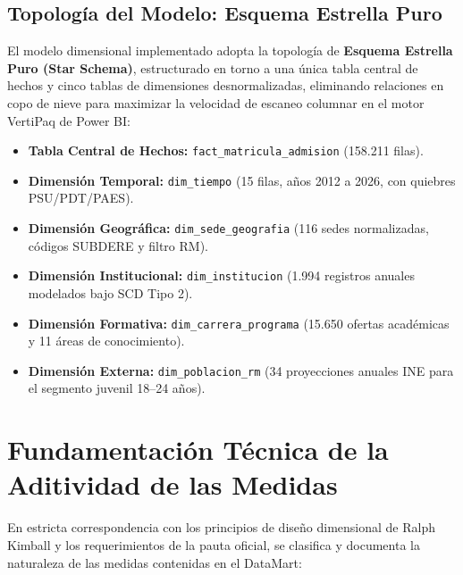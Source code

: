 \documentclass[11pt,a4paper]{article}
\begin{document}
\subsection{Topología del Modelo: Esquema Estrella Puro}
El modelo dimensional implementado adopta la topología de \textbf{Esquema Estrella Puro (Star Schema)}, estructurado en torno a una única tabla central de hechos y cinco tablas de dimensiones desnormalizadas, eliminando relaciones en copo de nieve para maximizar la velocidad de escaneo columnar en el motor VertiPaq de Power BI:
\begin{itemize}[leftmargin=*]
    \item \textbf{Tabla Central de Hechos:} \texttt{fact\_matricula\_admision} (158.211 filas).
    \item \textbf{Dimensión Temporal:} \texttt{dim\_tiempo} (15 filas, años 2012 a 2026, con quiebres PSU/PDT/PAES).
    \item \textbf{Dimensión Geográfica:} \texttt{dim\_sede\_geografia} (116 sedes normalizadas, códigos SUBDERE y filtro RM).
    \item \textbf{Dimensión Institucional:} \texttt{dim\_institucion} (1.994 registros anuales modelados bajo SCD Tipo 2).
    \item \textbf{Dimensión Formativa:} \texttt{dim\_carrera\_programa} (15.650 ofertas académicas y 11 áreas de conocimiento).
    \item \textbf{Dimensión Externa:} \texttt{dim\_poblacion\_rm} (34 proyecciones anuales INE para el segmento juvenil 18--24 años).
\end{itemize}

\section{Fundamentación Técnica de la Aditividad de las Medidas}
\label{sec:aditividad}

En estricta correspondencia con los principios de diseño dimensional de Ralph Kimball y los requerimientos de la pauta oficial, se clasifica y documenta la naturaleza de las medidas contenidas en el DataMart:
\end{document}
